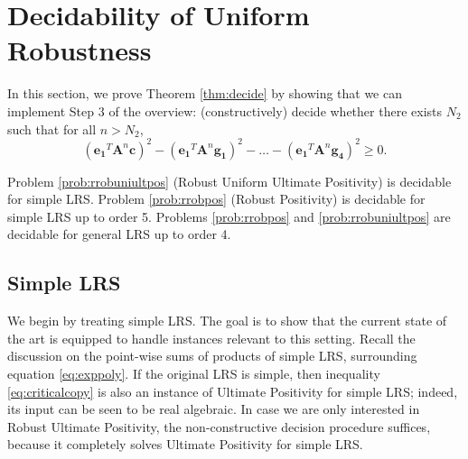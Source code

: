 \section{Decidability of Uniform Robustness}
\label{section:decidability}

  \label{thm:abelian}

In this section, we prove Theorem \ref{thm:decide} by showing that we can implement Step 3 of the overview: (constructively) decide whether there exists $N_2$ such that for all $n > N_2$,
\begin{equation}
\label{eq:criticalcopy}
(\mathbf{e_1}^T \mathbf{A}^n \mathbf{c})^2 - (\mathbf{e_1}^T \mathbf{A}^n \mathbf{g_1})^2 - \dots - (\mathbf{e_1}^T \mathbf{A}^n \mathbf{g_4})^2 \ge 0.
\end{equation}

\begin{theorem}
\label{thm:decidecopy}
Problem \ref{prob:rrobuniultpos} (Robust Uniform Ultimate Positivity) is decidable for simple LRS. Problem \ref{prob:rrobpos} (Robust Positivity) is decidable for simple LRS up to order 5. Problems \ref{prob:rrobpos} and \ref{prob:rrobuniultpos} are decidable for general LRS up to order 4.
\end{theorem}

\subsection{Simple LRS}
We begin by treating simple LRS. The goal is to show that the current state of the art is equipped to handle instances relevant to this setting. Recall the discussion on the point-wise sums of products of simple LRS, surrounding equation \ref{eq:exppoly}. If the original LRS is simple, then inequality \ref{eq:criticalcopy} is also an instance of Ultimate Positivity for simple LRS; indeed, its input can be seen to be real algebraic. In case we are only interested in Robust Ultimate Positivity, the non-constructive decision procedure \cite{ouaknine2014ultimate} suffices, because it completely solves Ultimate Positivity for simple LRS. 

